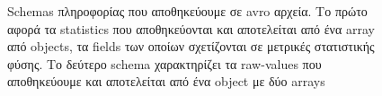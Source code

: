 \begin{figure}[!ht]
	\centering
	\caption[Schemas πληροφορίας που αποθηκεύουμε σε avro αρχεία]{Schemas πληροφορίας που αποθηκεύουμε σε avro αρχεία. Το πρώτο αφορά τα statistics που αποθηκεύονται και αποτελείται από ένα array από objects, τα fields των οποίων σχετίζονται σε μετρικές στατιστικής φύσης. Το δεύτερο schema χαρακτηρίζει τα raw-values που αποθηκεύουμε και αποτελείται από ένα object με δύο arrays}
	\label{fig:avro_types}
\end{figure}

